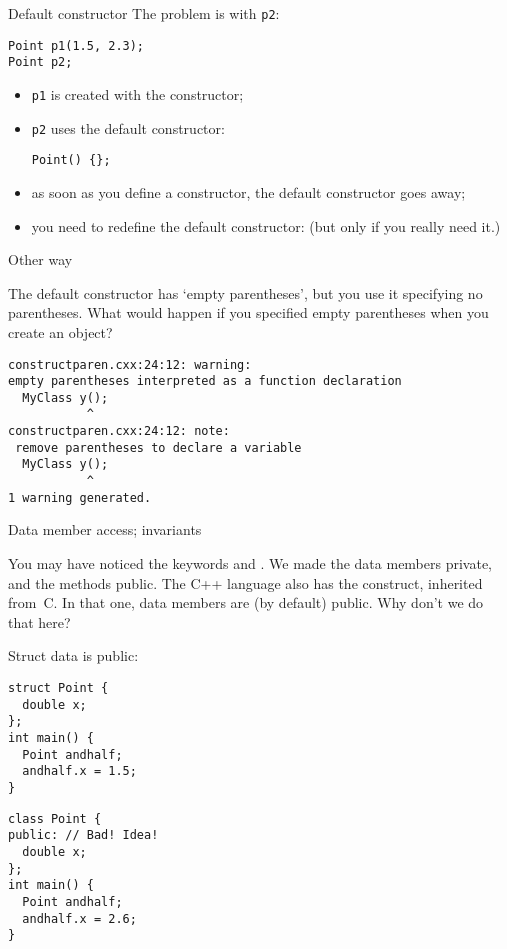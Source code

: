 \begin{slide}{Default constructor}
  \label{sl:obj-def-construct2}
  The problem is with \lstinline{p2}:
\begin{lstlisting}
Point p1(1.5, 2.3);
Point p2;
\end{lstlisting}
\begin{itemize}
\item \lstinline{p1} is created with the constructor;
\item \lstinline{p2} uses the default constructor:
\begin{lstlisting}
Point() {};
\end{lstlisting}
\item as soon as you define a constructor, the default constructor
  goes away;
\item you need to redefine the default constructor:
  (but only if you really need it.)
\end{itemize}
\end{slide}

\begin{slide}{Other way}
  \label{sl:obj-def-construct2a}
\end{slide}

\begin{remark}
  The default constructor has `empty parentheses', but you use
  it specifying no parentheses.
  What would happen if you specified empty parentheses when you create an object?
  

\begin{verbatim}
constructparen.cxx:24:12: warning: 
empty parentheses interpreted as a function declaration
  MyClass y();
           ^
constructparen.cxx:24:12: note:
 remove parentheses to declare a variable
  MyClass y();
           ^
1 warning generated.  
\end{verbatim}
\end{remark}

 {Data member access; invariants}

You may have noticed the keywords  and
. We made the data members private, and the
methods public.
The C++ language also has the  construct,
inherited from~C.
In that one, data members are (by default) public. Why don't we do that here?

\begin{multicols}{2}
Struct data is public:
\begin{lstlisting}
struct Point {
  double x;
};
int main() {
  Point andhalf;
  andhalf.x = 1.5;
}
\end{lstlisting}

\columnbreak

\begin{lstlisting}
class Point {
public: // Bad! Idea!
  double x;
};
int main() {
  Point andhalf;
  andhalf.x = 2.6;
}
\end{lstlisting}
\end{multicols}

